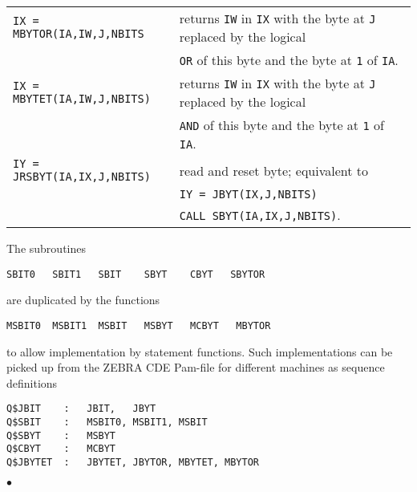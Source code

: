 \begin{tabular}{@{\hspace*{3mm}}ll}
{\tt IX = MBYTOR(IA,IW,J,NBITS}
& returns {\tt IW} in {\tt IX} with the byte at {\tt J} replaced by the
logical \\
& {\tt OR} of this byte and the byte at {\tt 1} of {\tt IA}. \\
{\tt IX = MBYTET(IA,IW,J,NBITS)}
& returns {\tt IW} in {\tt IX} with the byte at {\tt J} replaced by the
logical \\
& {\tt AND} of this byte and the byte at {\tt 1} of {\tt IA}. \\
{\tt IY = JRSBYT(IA,IX,J,NBITS)}
& read and reset byte; equivalent to \\
& {\tt IY = JBYT(IX,J,NBITS)} \\
& {\tt CALL SBYT(IA,IX,J,NBITS)}. \\
\end{tabular}
\Notes
The subroutines
\begin{verbatim}
SBIT0   SBIT1   SBIT    SBYT    CBYT   SBYTOR
\end{verbatim}
are duplicated by the functions
\begin{verbatim}
MSBIT0  MSBIT1  MSBIT   MSBYT   MCBYT   MBYTOR
\end{verbatim}
to allow implementation by statement functions.
Such implementations can be picked up from the ZEBRA CDE Pam-file for
different machines as sequence definitions
\begin{verbatim}
Q$JBIT    :   JBIT,   JBYT
Q$SBIT    :   MSBIT0, MSBIT1, MSBIT
Q$SBYT    :   MSBYT
Q$CBYT    :   MCBYT
Q$JBYTET  :   JBYTET, JBYTOR, MBYTET, MBYTOR
\end{verbatim}
$\bullet$
